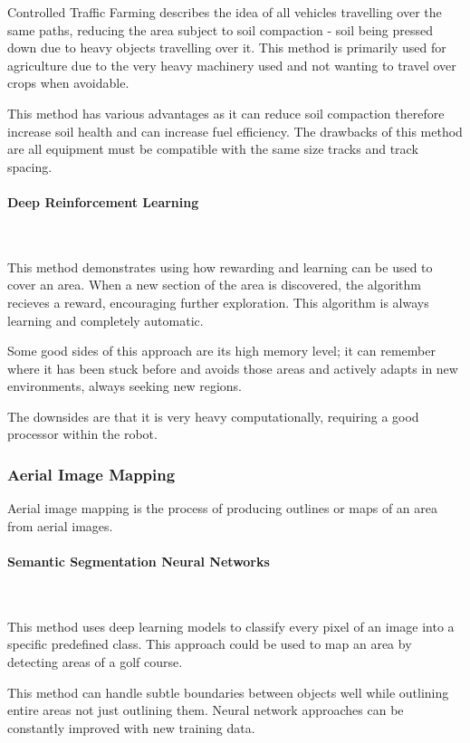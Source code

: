 \documentclass[final]{cmpreport_02}
\begin{document}
Controlled Traffic Farming \citep{chamen2015controlled} describes the idea of all vehicles travelling over the same paths, reducing the area subject to soil compaction - soil being pressed down due to heavy objects travelling over it.
This method is primarily used for agriculture due to the very heavy machinery used and not wanting to travel over crops when avoidable.

This method has various advantages as it can reduce soil compaction therefore increase soil health and can increase fuel efficiency.
The drawbacks of this method are all equipment must be compatible with the same size tracks and track spacing.

\paragraph{Deep Reinforcement Learning} \

This method \citep{chen2025complete} demonstrates using how rewarding and learning can be used to cover an area. 
When a new section of the area is discovered, the algorithm recieves a reward, encouraging further exploration.
This algorithm is always learning and completely automatic.

Some good sides of this approach are its high memory level; it can remember where it has been stuck before and avoids those areas and actively adapts in new environments, always seeking new regions.

The downsides are that it is very heavy computationally, requiring a good processor within the robot.


\subsubsection{Aerial Image Mapping}
Aerial image mapping is the process of producing outlines or maps of an area from aerial images.

\paragraph{Semantic Segmentation Neural Networks} \

This method uses deep learning models \citep{long2015fully} to classify every pixel of an image into a specific predefined class.
This approach could be used to map an area by detecting areas of a golf course.

This method can handle subtle boundaries between objects well while outlining entire areas not just outlining them.
Neural network approaches can be constantly improved with new training data.
\end{document}
